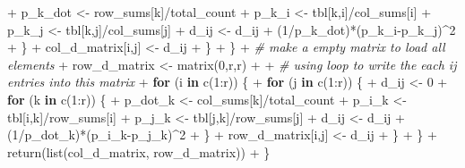 \documentclass[
]{article}
\newenvironment{Shaded}{\begin{snugshade}}{\end{snugshade}}
\newcommand{\CommentTok}[1]{\textcolor[rgb]{0.56,0.35,0.01}{\textit{#1}}}
\newcommand{\ControlFlowTok}[1]{\textcolor[rgb]{0.13,0.29,0.53}{\textbf{#1}}}
\newcommand{\DecValTok}[1]{\textcolor[rgb]{0.00,0.00,0.81}{#1}}
\newcommand{\FunctionTok}[1]{\textcolor[rgb]{0.00,0.00,0.00}{#1}}
\newcommand{\NormalTok}[1]{#1}
\newcommand{\OtherTok}[1]{\textcolor[rgb]{0.56,0.35,0.01}{#1}}
\newcommand{\SpecialCharTok}[1]{\textcolor[rgb]{0.00,0.00,0.00}{#1}}
\begin{document}
\begin{Shaded}
\begin{Highlighting}[]
\SpecialCharTok{+}\NormalTok{         p\_k\_dot }\OtherTok{\textless{}{-}}\NormalTok{ row\_sums[k]}\SpecialCharTok{/}\NormalTok{total\_count}
\SpecialCharTok{+}\NormalTok{         p\_k\_i }\OtherTok{\textless{}{-}}\NormalTok{ tbl[k,i]}\SpecialCharTok{/}\NormalTok{col\_sums[i]}
\SpecialCharTok{+}\NormalTok{         p\_k\_j }\OtherTok{\textless{}{-}}\NormalTok{ tbl[k,j]}\SpecialCharTok{/}\NormalTok{col\_sums[j]}
\SpecialCharTok{+}\NormalTok{         d\_ij }\OtherTok{\textless{}{-}}\NormalTok{ d\_ij }\SpecialCharTok{+}\NormalTok{ (}\DecValTok{1}\SpecialCharTok{/}\NormalTok{p\_k\_dot)}\SpecialCharTok{*}\NormalTok{(p\_k\_i}\SpecialCharTok{{-}}\NormalTok{p\_k\_j)}\SpecialCharTok{\^{}}\DecValTok{2}
\SpecialCharTok{+}\NormalTok{       \}}
\SpecialCharTok{+}\NormalTok{       col\_d\_matrix[i,j] }\OtherTok{\textless{}{-}}\NormalTok{ d\_ij}
\SpecialCharTok{+}\NormalTok{     \}}
\SpecialCharTok{+}\NormalTok{   \}}
\SpecialCharTok{+}   \CommentTok{\# make a empty matrix to load all elements}
\SpecialCharTok{+}\NormalTok{   row\_d\_matrix }\OtherTok{\textless{}{-}} \FunctionTok{matrix}\NormalTok{(}\DecValTok{0}\NormalTok{,r,r)}
\SpecialCharTok{+}   
\SpecialCharTok{+}   \CommentTok{\# using loop to write the each ij entries into this matrix}
\SpecialCharTok{+}   \ControlFlowTok{for}\NormalTok{ (i }\ControlFlowTok{in} \FunctionTok{c}\NormalTok{(}\DecValTok{1}\SpecialCharTok{:}\NormalTok{r)) \{}
\SpecialCharTok{+}     \ControlFlowTok{for}\NormalTok{ (j }\ControlFlowTok{in} \FunctionTok{c}\NormalTok{(}\DecValTok{1}\SpecialCharTok{:}\NormalTok{r)) \{}
\SpecialCharTok{+}\NormalTok{       d\_ij }\OtherTok{\textless{}{-}} \DecValTok{0}
\SpecialCharTok{+}       \ControlFlowTok{for}\NormalTok{ (k }\ControlFlowTok{in} \FunctionTok{c}\NormalTok{(}\DecValTok{1}\SpecialCharTok{:}\NormalTok{r)) \{}
\SpecialCharTok{+}\NormalTok{         p\_dot\_k }\OtherTok{\textless{}{-}}\NormalTok{ col\_sums[k]}\SpecialCharTok{/}\NormalTok{total\_count}
\SpecialCharTok{+}\NormalTok{         p\_i\_k }\OtherTok{\textless{}{-}}\NormalTok{ tbl[i,k]}\SpecialCharTok{/}\NormalTok{row\_sums[i]}
\SpecialCharTok{+}\NormalTok{         p\_j\_k }\OtherTok{\textless{}{-}}\NormalTok{ tbl[j,k]}\SpecialCharTok{/}\NormalTok{row\_sums[j]}
\SpecialCharTok{+}\NormalTok{         d\_ij }\OtherTok{\textless{}{-}}\NormalTok{ d\_ij }\SpecialCharTok{+}\NormalTok{ (}\DecValTok{1}\SpecialCharTok{/}\NormalTok{p\_dot\_k)}\SpecialCharTok{*}\NormalTok{(p\_i\_k}\SpecialCharTok{{-}}\NormalTok{p\_j\_k)}\SpecialCharTok{\^{}}\DecValTok{2}
\SpecialCharTok{+}\NormalTok{       \}}
\SpecialCharTok{+}\NormalTok{       row\_d\_matrix[i,j] }\OtherTok{\textless{}{-}}\NormalTok{ d\_ij}
\SpecialCharTok{+}\NormalTok{     \}}
\SpecialCharTok{+}\NormalTok{   \}}
\SpecialCharTok{+}   \FunctionTok{return}\NormalTok{(}\FunctionTok{list}\NormalTok{(col\_d\_matrix, row\_d\_matrix))}
\SpecialCharTok{+}\NormalTok{ \}}
\end{Highlighting}
\end{Shaded}
\end{document}

